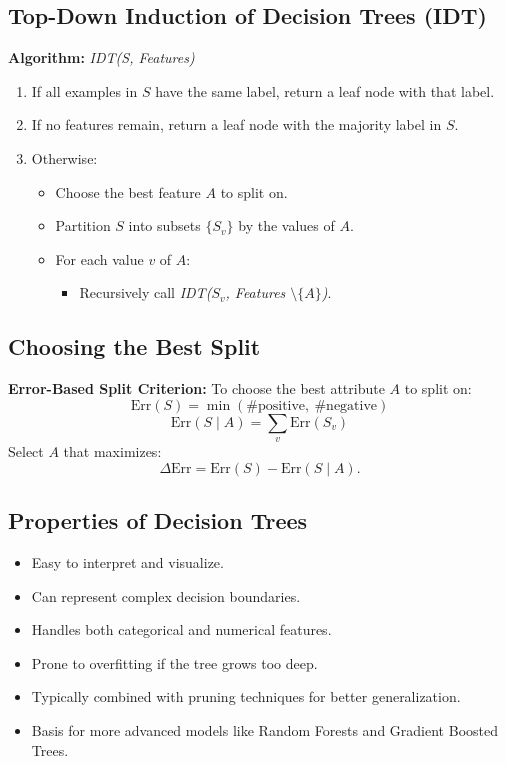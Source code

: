 \subsection{Top-Down Induction of Decision Trees (IDT)}

\begin{algobox}
\textbf{Algorithm:} \emph{IDT(S, Features)}
\begin{enumerate}
    \item If all examples in $S$ have the same label, return a leaf node with that label.
    \item If no features remain, return a leaf node with the majority label in $S$.
    \item Otherwise:
    \begin{itemize}
        \item Choose the best feature $A$ to split on.
        \item Partition $S$ into subsets $\{S_v\}$ by the values of $A$.
        \item For each value $v$ of $A$:
        \begin{itemize}
            \item Recursively call \emph{IDT($S_v$, Features $\setminus \{A\}$)}.
        \end{itemize}
    \end{itemize}
\end{enumerate}
\end{algobox}

\subsection{Choosing the Best Split}

\textbf{Error-Based Split Criterion:}  
To choose the best attribute $A$ to split on:
\[
\text{Err}(S) = \min(\#\text{positive},\ \#\text{negative})
\]
\[
\text{Err}(S \mid A) = \sum_{v} \text{Err}(S_v)
\]
Select $A$ that maximizes:
\[
\Delta \text{Err} = \text{Err}(S) - \text{Err}(S \mid A).
\]

\subsection{Properties of Decision Trees}

\begin{itemize}
    \item Easy to interpret and visualize.
    \item Can represent complex decision boundaries.
    \item Handles both categorical and numerical features.
    \item Prone to overfitting if the tree grows too deep.
    \item Typically combined with pruning techniques for better generalization.
    \item Basis for more advanced models like Random Forests and Gradient Boosted Trees.
\end{itemize}